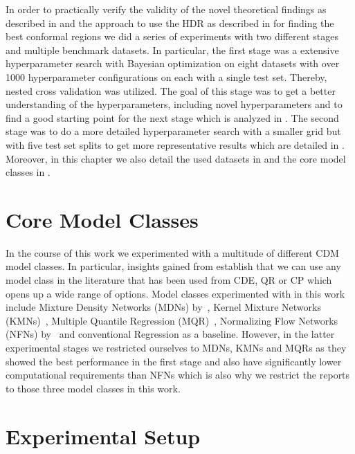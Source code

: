 In order to practically verify the validity of the novel theoretical findings as described in  and the approach to use the HDR as described in  for finding the best conformal regions we did a series of experiments with two different stages and multiple benchmark datasets. In particular, the first stage was a extensive hyperparameter search with Bayesian optimization on eight datasets with over 1000 hyperparameter configurations on each with a single test set. Thereby, nested cross validation was utilized. The goal of this stage was to get a better understanding of the hyperparameters, including novel hyperparameters and to find a good starting point for the next stage which is analyzed in . The second stage was to do a more detailed hyperparameter search with a smaller grid but with five test set splits to get more representative results which are detailed in . Moreover, in this chapter we also detail the used datasets in  and the core model classes in .

\section{Core Model Classes}\label{sec:core_model_classes}

In the course of this work we experimented with a multitude of different CDM model classes. In particular, insights gained from  establish that we can use any model class in the literature that has been used from CDE, QR or CP which opens up a wide range of options. Model classes experimented with in this work include Mixture Density Networks (MDNs) by~\cite{bishop1994mixture}, Kernel Mixture Networks (KMNs)~\cite{ambrogioni2017kernel}, Multiple Quantile Regression (MQR)~\cite{gupta2022nested,moon2021learning}, Normalizing Flow Networks (NFNs) by~\cite{trippe2018conditional} and conventional Regression as a baseline. However, in the latter experimental stages we restricted ourselves to MDNs, KMNs and MQRs as they showed the best performance in the first stage and also have significantly lower computational requirements than NFNs which is also why we restrict the reports to those three model classes in this work.

\section{Experimental Setup}\label{sec:experimental_setup}

